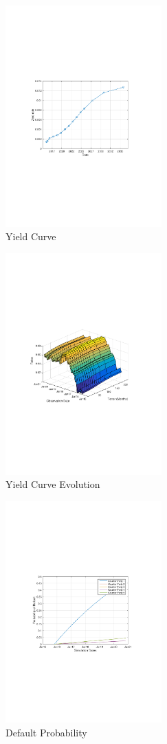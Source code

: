 \documentclass{amsart}
\theoremstyle{definition}\newtheorem{definition}[theorem]{Definition}
\theoremstyle{remark}\newtheorem{remark}[theorem]{Remark}
\begin{document}
\begin{figure}[!htbp]
  \centering 
	\includegraphics[width=6cm, clip, trim= 110 270 110 270]{IMG/YieldCurve.pdf}
  \caption{Yield Curve}  \label{YieldCurve}
\end{figure}

\begin{figure}[!htbp]
  \centering 
	\includegraphics[width=6cm, clip, trim= 110 270 110 270]{IMG/YieldCurveEvolution.pdf}
  \caption{Yield Curve Evolution}  \label{YieldCurveEvolution}
\end{figure}

\begin{figure}[!htbp]
  \centering 
	\includegraphics[width=6cm, clip, trim= 110 270 110 270]{IMG/DefaultProbability.pdf}
  \caption{Default Probability}  \label{DefaultProbability}
\end{figure}
\end{document}
